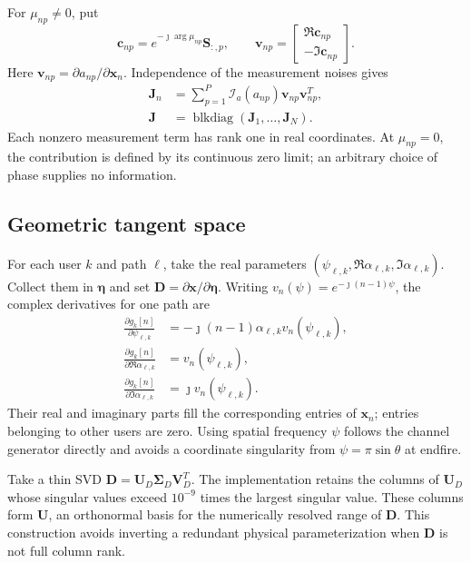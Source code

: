 \documentclass[11pt,a4paper]{article}
\begin{document}
For $\mu_{np}\ne0$, put
\begin{equation}
\mathbf c_{np}=e^{-\jmath\arg\mu_{np}}\mathbf S_{:,p},
\qquad
\mathbf v_{np}=
\begin{bmatrix}\Re\mathbf c_{np}\\-\Im\mathbf c_{np}\end{bmatrix}.
\end{equation}
Here $\mathbf v_{np}=\partial a_{np}/\partial\mathbf x_n$.
Independence of the measurement noises gives
\begin{align}
\mathbf J_n&=\sum_{p=1}^{P}
  \mathcal I_a(a_{np})\mathbf v_{np}\mathbf v_{np}^T,\\
\mathbf J&=\operatorname{blkdiag}
 (\mathbf J_1,\ldots,\mathbf J_N).
\label{eq:revision-real-fisher}
\end{align}
Each nonzero measurement term has rank one in real coordinates. At
$\mu_{np}=0$, the contribution is defined by its continuous zero limit;
an arbitrary choice of phase supplies no information.

\subsection{Geometric tangent space}

For each user $k$ and path $\ell$, take the real parameters
$(\psi_{\ell,k},\Re\alpha_{\ell,k},\Im\alpha_{\ell,k})$.
Collect them in $\boldsymbol\eta$ and set
$\mathbf D=\partial\mathbf x/\partial\boldsymbol\eta$.
Writing $v_n(\psi)=e^{-\jmath(n-1)\psi}$, the complex derivatives for
one path are
\begin{align}
\frac{\partial g_k[n]}{\partial\psi_{\ell,k}}
 &=-\jmath(n-1)\alpha_{\ell,k}v_n(\psi_{\ell,k}),\\
\frac{\partial g_k[n]}{\partial\Re\alpha_{\ell,k}}
 &=v_n(\psi_{\ell,k}),\\
\frac{\partial g_k[n]}{\partial\Im\alpha_{\ell,k}}
 &=\jmath v_n(\psi_{\ell,k}).
\end{align}
Their real and imaginary parts fill the corresponding entries of
$\mathbf x_n$; entries belonging to other users are zero. Using spatial
frequency $\psi$ follows the channel generator directly and avoids a
coordinate singularity from $\psi=\pi\sin\theta$ at endfire.

Take a thin SVD $\mathbf D=\mathbf U_D\boldsymbol\Sigma_D\mathbf V_D^T$.
The implementation retains the columns of $\mathbf U_D$ whose singular
values exceed $10^{-9}$ times the largest singular value. These columns
form $\mathbf U$, an orthonormal basis for the numerically resolved range
of $\mathbf D$. This construction avoids inverting a redundant physical
parameterization when $\mathbf D$ is not full column rank.
\end{document}
